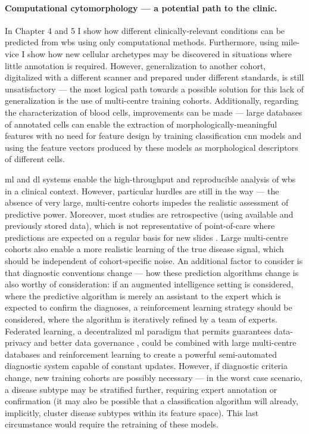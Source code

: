 \paragraph{Computational cytomorphology --- a potential path to the clinic.} In Chapter 4 and 5 I show how different clinically-relevant conditions can be predicted from \ac{wbs} using only computational methods. Furthermore, using \ac{mile-vice} I show how new cellular archetypes may be discovered in situations where little annotation is required. However, generalization to another cohort, digitalized with a different scanner and prepared under different standards, is still unsatisfactory --- the most logical path towards a possible solution for this lack of generalization is the use of multi-centre training cohorts. Additionally, regarding the characterization of blood cells, improvements can be made --- large databases of annotated cells can enable the extraction of morphologically-meaningful features with no need for feature design by training classification \ac{cnn} models and using the feature vectors produced by these models as morphological descriptors of different cells.

\Ac{ml} and \ac{dl} systems enable the high-throughput and reproducible analysis of \ac{wbs} in a clinical context. However, particular hurdles are still in the way --- the absence of very large, multi-centre cohorts impedes the realistic assessment of predictive power. Moreover, most studies are retrospective (using available and previously stored data), which is not representative of point-of-care where predictions are expected on a regular basis for new slides \cite{Eckardt2020-fp}. Large multi-centre cohorts also enable a more realistic learning of the true disease signal, which should be independent of cohort-specific noise. An additional factor to consider is that diagnostic conventions change --- how these prediction algorithms change is also worthy of consideration: if an augmented intelligence setting is considered, where the predictive algorithm is merely an assistant to the expert which is expected to confirm the diagnoses, a reinforcement learning strategy should be considered, where the algorithm is iteratively refined by a team of experts. Federated learning, a decentralized \ac{ml} paradigm that permits guarantees data-privacy and better data governance \cite{Rieke2020-hl}, could be combined with large multi-centre databases and reinforcement learning to create a powerful semi-automated diagnostic system capable of constant updates. However, if diagnostic criteria change, new training cohorts are possibly necessary --- in the worst case scenario, a disease subtype may be stratified further, requiring expert annotation or confirmation (it may also be possible that a classification algorithm will already, implicitly, cluster disease subtypes within its feature space). This last circumstance would require the retraining of these models.

